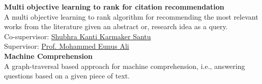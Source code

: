 \documentclass[10pt]{article}
\renewcommand{\section}[1]{\pagebreak[3]%
    \hyphenpenalty=10000%
    \vspace{1.3\baselineskip}%
    \phantomsection\addcontentsline{toc}{section}{#1}%
    \noindent\llap{\scshape\smash{\parbox[t]{\marginparwidth}{\raggedright #1}}}%
    \vspace{-\baselineskip}\par}
\begin{document}
{{\textbf{Multi objective learning to rank for citation recommendation}\\ %
A multi objective learning to rank algorithm for recommending the most relevant works from the literature given an abstract or, research idea as a query.\\
Co-supervisor: \href{https://sites.google.com/site/kantishubhra006/}{Shubhra Kanti Karmaker Santu}\\ 
Supervisor: \href{http://cse.buet.ac.bd/faculty/facdetail.php?id=eunus}{Prof. Mohammed Eunus Ali} \\
 
\textbf{Machine Comprehension}\\
A graph-traversal based approach for machine comprehension, i.e., answering questions based on a given piece of text.   

\begin{comment}
\textbf{InnerEye: An Automated Tool for Detecting the Extent of Image Editing to Aid Credible Social Interactions}\\  %
The goal of this project to quantifying how much editing is done on a given image to facilitate credible interactions in social media.\\
Supervisor: \href{https://sites.google.com/site/abmalimalislam/home}{Prof. A. B. M. Alim Al Islam}\\ 
\end{comment}

\begin{comment}

\section{Current Projects}
\textbf{Machine Comprehension using Reinforcement Learning} \hfill{March 2016 - Present}\\
The goal of this research is to design a reinforcement learning based method for machine comprehension, i.e., answering questions based on a given piece of text. Currently, we are focusing on multiple choice questions.\\ Supervisor: \href{http://cse.buet.ac.bd/faculty/facdetail.php?id=mdmonirulislam}{Prof. Md. Monirul Islam}.\\


\end{comment}}}
\end{document}
